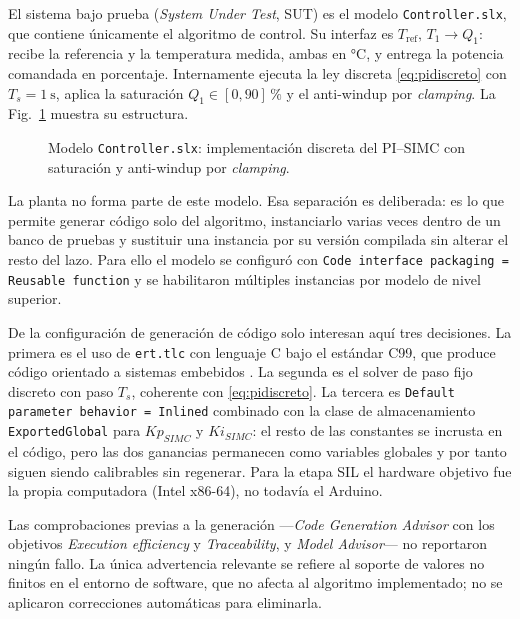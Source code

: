 \documentclass[conference,a4paper,10pt]{IEEEtran}
\newif\ifmostrarpendientes
\newcommand{\pendiente}[1]{%
  \ifmostrarpendientes
    \par\noindent\fcolorbox{cRojo}{red!4}{%
      \parbox{0.95\columnwidth}{\scriptsize\color{cRojo}\textbf{PENDIENTE:} #1}}\par\smallskip
  \fi}
\newcommand{\Tref}{T_{\mathrm{ref}}}
\begin{document}
El sistema bajo prueba (\emph{System Under Test}, SUT) es el modelo \texttt{Controller.slx}, que
contiene únicamente el algoritmo de control. Su interfaz es
$\Tref,\,T_1 \rightarrow Q_1$: recibe la referencia y la temperatura medida, ambas en
\si{\celsius}, y entrega la potencia comandada en porcentaje. Internamente ejecuta la ley discreta
\eqref{eq:pidiscreto} con $T_s = \SI{1}{\second}$, aplica la saturación
$Q_1 \in [0,90]\,\si{\percent}$ y el anti-windup por \emph{clamping}. La Fig.~\ref{fig:controller}
muestra su estructura.

\pendiente{Insertar aquí la captura de \texttt{Controller.slx} (Simulink) como
\texttt{figuras/controller.png}. Es la única captura que el instructivo pide explícitamente.}

\begin{figure}[!t]
\centering
\caption{Modelo \texttt{Controller.slx}: implementación discreta del PI--SIMC con saturación y
anti-windup por \emph{clamping}.}
\label{fig:controller}
\end{figure}

La planta no forma parte de este modelo. Esa separación es deliberada: es lo que permite generar
código solo del algoritmo, instanciarlo varias veces dentro de un banco de pruebas y sustituir una
instancia por su versión compilada sin alterar el resto del lazo. Para ello el modelo se configuró
con \texttt{Code interface packaging = Reusable function} y se habilitaron múltiples instancias por
modelo de nivel superior.

De la configuración de generación de código solo interesan aquí tres decisiones. La primera es el
uso de \texttt{ert.tlc} con lenguaje C bajo el estándar C99, que produce código orientado a sistemas
embebidos \cite{mw_codegen}. La segunda es el solver de paso fijo discreto con paso $T_s$, coherente
con \eqref{eq:pidiscreto}. La tercera es \texttt{Default parameter behavior = Inlined} combinado con
la clase de almacenamiento \texttt{ExportedGlobal} para $Kp_{SIMC}$ y $Ki_{SIMC}$: el resto de las
constantes se incrusta en el código, pero las dos ganancias permanecen como variables globales y por
tanto siguen siendo calibrables sin regenerar. Para la etapa SIL el hardware objetivo fue la propia
computadora (Intel x86-64), no todavía el Arduino.

Las comprobaciones previas a la generación ---\emph{Code Generation Advisor} con los objetivos
\emph{Execution efficiency} y \emph{Traceability}, y \emph{Model Advisor}--- no reportaron ningún
fallo. La única advertencia relevante se refiere al soporte de valores no finitos en el entorno de
software, que no afecta al algoritmo implementado; no se aplicaron correcciones automáticas para
eliminarla.
\end{document}
